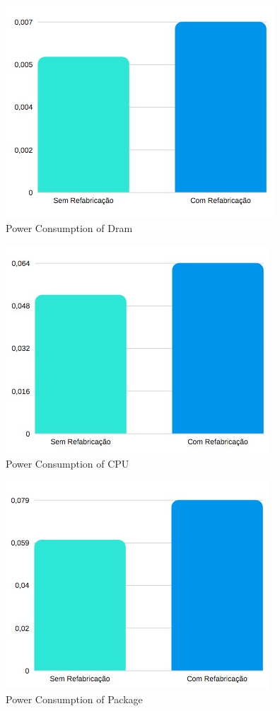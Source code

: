 \begin{figure}[H]
    \centering
    \includegraphics[scale=0.8]{tex/img/graficos/7.jpg}
    \caption{Power Consumption of Dram}
\end{figure}

\begin{figure}[H]
    \centering
    \includegraphics[scale=0.8]{tex/img/graficos/8.jpg}
    \caption{Power Consumption of CPU}
\end{figure}

\begin{figure}[H]
    \centering
    \includegraphics[scale=0.8]{tex/img/graficos/9.jpg}
    \caption{Power Consumption of Package}
\end{figure}


